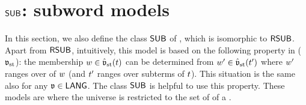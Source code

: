 

\section{$\mathsf{SUB}$: subword models}\label{section: SUBW}
In this section, we also define the class $\mathsf{SUB}$ of \emph{}, which is isomorphic to $\mathsf{RSUB}$.
Apart from $\mathsf{RSUB}$, intuitively, this model is based on the following property in  ($\mathfrak{v}_{\mathrm{st}}$):
the membership $\word \in \hat{\val}_{\mathrm{st}}(\term)$ can be determined from $\word' \in \hat{\val}_{\mathrm{st}}(\term')$ where $\word'$ ranges over \emph{} of $\word$ (and $\term'$ ranges over subterms of $\term$).
This situation is the same also for any  $\mathfrak{v} \in \mathsf{LANG}$.
The class $\mathsf{SUB}$ is helpful to use this property.
These models are  where the universe is restricted to the set of  of a .

